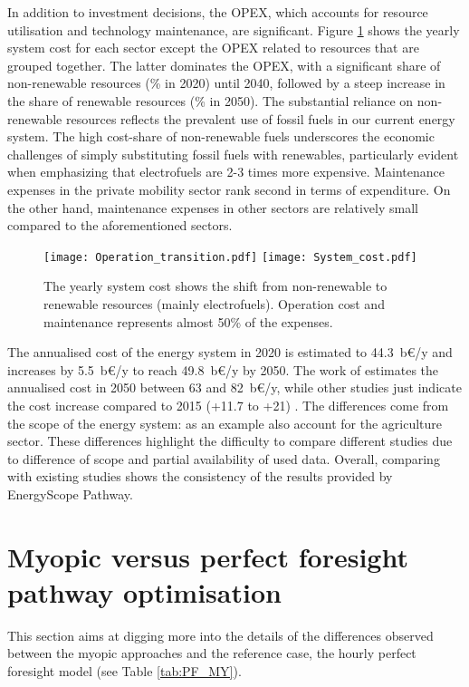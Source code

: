In addition to investment decisions, the \acrfull{OPEX}, which accounts for resource utilisation and technology maintenance, are significant. Figure \ref{fig:pestd_cumul_op} shows the yearly system cost for each sector except the \gls{OPEX} related to resources that are grouped together. The latter dominates the \gls{OPEX}, with a significant share of non-renewable resources (\% in 2020) until 2040, followed by a steep increase in the share of renewable resources (\% in 2050). The substantial reliance on non-renewable resources reflects the prevalent use of fossil fuels in our current energy system. The high cost-share of non-renewable fuels underscores the economic challenges of simply substituting fossil fuels with renewables, particularly evident when emphasizing that electrofuels are 2-3 times more expensive. Maintenance expenses in the private mobility sector rank second in terms of expenditure. On the other hand, maintenance expenses in other sectors are relatively small compared to the aforementioned sectors.

\begin{figure}[!htbp] %
\centering
\texttt{[image: Operation\_transition.pdf]}
\texttt{[image: System\_cost.pdf]}
\caption{The yearly system cost shows the shift from non-renewable to renewable resources (mainly electrofuels). Operation cost and maintenance represents almost 50\% of the expenses.}
\label{fig:pestd_cumul_op}
\end{figure}

The annualised cost of the energy system in 2020 is estimated to 44.3~b€/y and increases by 5.5~b€/y to reach 49.8~b€/y by 2050. The work of \citet{My2050} estimates the annualised cost in 2050 between 63 and 82~b€/y, while other studies just indicate the cost increase compared to 2015 (+11.7 to +21) \citep{Devogelaer2013,PATHS2050}. The differences come from the scope of the energy system: as an example \citet{My2050} also account for the agriculture sector. These differences highlight the difficulty to compare different studies due to difference of scope and partial availability of used data. Overall, comparing with existing studies shows the consistency of the results provided by EnergyScope Pathway.

\newpage
\section{Myopic versus perfect foresight pathway optimisation}
\label{app:my_vs_pf}
This section aims at digging more into the details of the differences observed between the myopic approaches and the reference case, the hourly perfect foresight model (see Table \ref{tab:PF_MY}).

